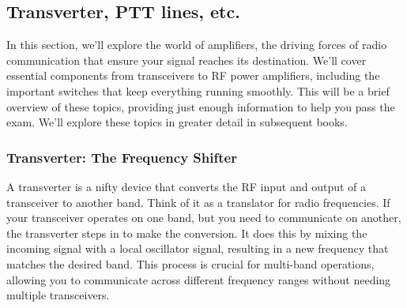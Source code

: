 \subsection{Transverter, PTT lines, etc.}
\label{subsec:transverter-ptt}

In this section, we'll explore the world of amplifiers, the driving forces of radio communication that ensure your signal reaches its destination. We'll cover essential components from transceivers to RF power amplifiers, including the important switches that keep everything running smoothly. This will be a brief overview of these topics, providing just enough information to help you pass the exam. We'll explore these topics in greater detail in subsequent books.

\subsubsection*{Transverter: The Frequency Shifter}
A transverter is a nifty device that converts the RF input and output of a transceiver to another band. Think of it as a translator for radio frequencies. If your transceiver operates on one band, but you need to communicate on another, the transverter steps in to make the conversion. It does this by mixing the incoming signal with a local oscillator signal, resulting in a new frequency that matches the desired band. This process is crucial for multi-band operations, allowing you to communicate across different frequency ranges without needing multiple transceivers.

